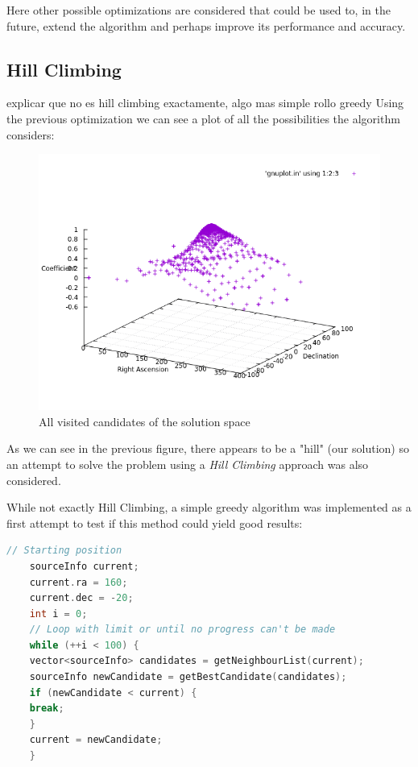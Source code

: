 Here other possible optimizations are considered that could be used to, in the future, extend the algorithm and perhaps improve its performance and accuracy.

\subsection{Hill Climbing}

explicar que no es hill climbing exactamente, algo mas simple rollo greedy 
Using the previous optimization we can see a plot of all the possibilities the algorithm considers:

\begin{figure}[!htb]
	\begin{centering}
		\includegraphics[width=0.5\linewidth]{images/ch6/hillClimbing/resultsAll.png}
		\caption{All visited candidates of the solution space}
		\label{fig:solutionSpace}
	\end{centering}
\end{figure}

As we can see in the previous figure, there appears to be a "hill" (our solution) so an attempt to solve the problem using a \textit{Hill Climbing} approach was also considered.

While not exactly Hill Climbing, a simple greedy algorithm was implemented as a first attempt to test if this method could yield good results:

\begin{minipage}{\linewidth}
	\begin{lstlisting}[language=c, caption=Hill Climbing]
	// Starting position
	sourceInfo current;
	current.ra = 160;
	current.dec = -20;
	int i = 0;
	// Loop with limit or until no progress can't be made
	while (++i < 100) {
	vector<sourceInfo> candidates = getNeighbourList(current);
	sourceInfo newCandidate = getBestCandidate(candidates);
	if (newCandidate < current) {
	break;
	}
	current = newCandidate;
	}
	\end{lstlisting}
\end{minipage}

